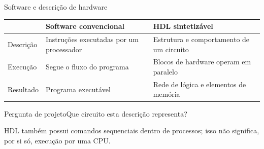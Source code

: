 \begin{frame}[t]{Software e descrição de hardware}
\small
\begin{tabularx}{\textwidth}{lXX}
\toprule & Software convencional & HDL sintetizável\\\midrule
Descrição & Instruções executadas por um processador & Estrutura e comportamento de um circuito\\[0.2cm]
Execução & Segue o fluxo do programa & Blocos de hardware operam em paralelo\\[0.2cm]
Resultado & Programa executável & Rede de lógica e elementos de memória\\\bottomrule
\end{tabularx}
\begin{block}{Pergunta de projeto}Que circuito esta descrição representa?\end{block}
HDL também possui comandos sequenciais dentro de processos; isso não significa, por si só, execução por uma CPU.
\end{frame}
